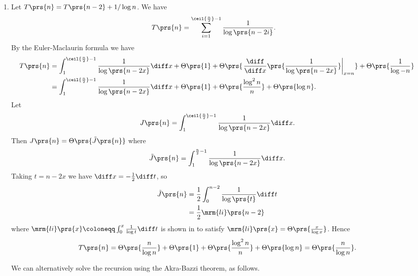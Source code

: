 \documentclass[oneside]{scrbook}
\theoremstyle{definition}
\begin{document}
\begin{problem}
\begin{enumerate}[label=\alph*.]
\item %
Let $T\prs{n} = T\prs{n - 2} + 1 / \log n$. We have
\begin{align*}
T\prs{n} &= \sum_{i = 1}^{\ceil{\frac{n}{2}} - 1} \frac{1}{\log\prs{n - 2i}} \text{.}
\end{align*}
By the Euler-Maclaurin formula we have
\begin{align*}
T\prs{n} &= \int_1^{\ceil{\frac{n}{2}} - 1} \frac{1}{\log\prs{n - 2x}} \diff x + \Theta\prs{1} + \Theta\prs{\left. \frac{\diff}{\diff x} \prs{\frac{1}{\log \prs{n - 2x}}} \right|_{x=n}} + \Theta\prs{\frac{1}{\log -n}}
\\&=
\int_1^{\ceil{\frac{n}{2}} - 1} \frac{1}{\log\prs{n - 2x}} \diff x + \Theta\prs{1} + \Theta\prs{\frac{\log^2 n}{n}} + \Theta\prs{\log n} \text{.}
\end{align*}
Let \[J\prs{n} = \int_1^{\ceil{\frac{n}{2}} - 1} \frac{1}{\log\prs{n-2x}} \diff x \text{.}\]
Then $J\prs{n} = \Theta\prs{\tilde{J}\prs{n}}$ where
\begin{align*}
\tilde{J}\prs{n} = \int_1^{\frac{n}{2} - 1} \frac{1}{\log\prs{n-2x}} \diff x \text{.}
\end{align*}
Taking $t = n - 2x$ we have $\diff x = - \frac{1}{2} \diff t$, so
\begin{align*}
\tilde{J}\prs{n} &= \frac{1}{2} \int_0^{n-2} \frac{1}{\log\prs{t}} \diff t
\\&= \frac{1}{2} \mrm{li}\prs{n-2}
\end{align*}
where $\mrm{li}\prs{x} \coloneqq \int_0^x \frac{1}{\log t} \diff t$ is shown in  to satisfy $\mrm{li}\prs{x} = \Theta\prs{\frac{x}{\log x}}$. Hence
\begin{align*}
T\prs{n} = \Theta\prs{\frac{n}{\log n}} + \Theta\prs{1} + \Theta\prs{\frac{\log^2 n}{n}} + \Theta\prs{\log n} = \Theta\prs{\frac{n}{\log n}} \text{.}
\end{align*}

We can alternatively solve the recursion using the Akra-Bazzi theorem, as follows.


\end{enumerate}
\end{problem}
\end{document}
